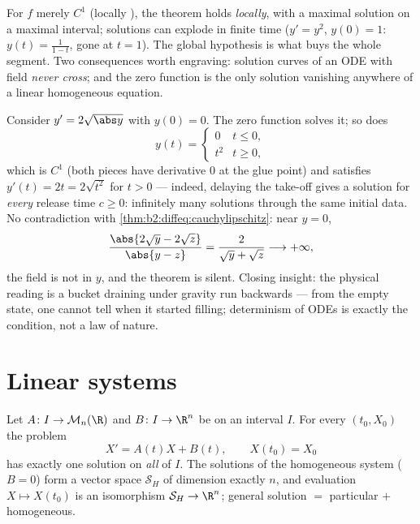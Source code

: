 \begin{remark}
For $f$ merely $C^1$ (locally ), the theorem holds
\emph{locally}, with a maximal solution on a maximal  interval;
solutions can explode in finite time ($y' = y^2$, $y(0) = 1$: $y(t)
= \frac{1}{1-t}$, gone at $t = 1$). The global  hypothesis
is what buys the whole segment. Two consequences worth engraving:
solution curves of an ODE with  field \emph{never cross};
and the zero function is the only solution vanishing anywhere of a
linear homogeneous equation.
\end{remark}

\begin{example}\label{ex:b2:diffeq:leaky}
Consider $y' = 2\sqrt{\abs y}$ with $y(0) = 0$. The zero
function solves it; so does
\[
y(t) = \begin{cases} 0 & t \leq 0,\\ t^2 & t \geq 0,
\end{cases}
\]
which is $C^1$ (both pieces have derivative $0$ at the glue
point) and satisfies $y'(t) = 2t = 2\sqrt{t^2}$ for $t > 0$ ---
indeed, delaying the take-off gives a solution for \emph{every}
release time $c \geq 0$: infinitely many solutions through the
same initial data. No contradiction with
\cref{thm:b2:diffeq:cauchylipschitz}: near $y = 0$,
\[
\frac{\abs{2\sqrt y - 2\sqrt z}}{\abs{y - z}}
= \frac{2}{\sqrt y + \sqrt z} \longrightarrow +\infty ,
\]
the field is not  in $y$, and the theorem is silent.
Closing insight: the physical reading is a bucket draining
under gravity run backwards --- from the empty state, one
cannot tell when it started filling; determinism of ODEs is
exactly the  condition, not a law of nature.
\end{example}

\section{Linear systems}

\begin{theorem}\label{thm:b2:diffeq:linear}
Let $A \colon I \to \mathcal{M}_n(\R)$ and $B \colon I \to \R^n$ be
 on an interval $I$. For every $(t_0, X_0)$ the problem
\[
X' = A(t)X + B(t), \qquad X(t_0) = X_0
\]
has exactly one solution on \emph{all} of $I$. The solutions of the
homogeneous system ($B = 0$) form a vector space $\mathcal{S}_H$ of
dimension exactly $n$, and evaluation $X \mapsto X(t_0)$ is an
isomorphism $\mathcal{S}_H \to \R^n$; general solution $=$
particular $+$ homogeneous.
\end{theorem}

